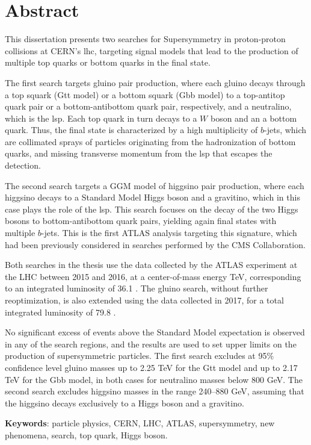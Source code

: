 \chapter*{Abstract}

This dissertation presents two searches for Supersymmetry in proton-proton collisions at CERN's \gls{lhc}, 
targeting signal models that lead to the production of multiple top quarks or bottom quarks in the final state.

The first search targets gluino pair production, where each gluino decays through a top squark (Gtt model) or a bottom squark (Gbb model) 
to a top-antitop quark pair or a bottom-antibottom quark pair, respectively, and a neutralino, which is the \gls{lsp}. 
Each top quark in turn decays to a $W$ boson and an a bottom quark.
Thus, the final state is characterized by a high multiplicity of $b$-jets, which are collimated sprays of particles originating from the hadronization of bottom quarks, and 
missing transverse momentum from the \gls{lsp} that escapes the detection. 

The second search targets a GGM model of higgsino pair production, 
where each higgsino decays to a Standard Model Higgs boson and 
a gravitino, which in this case plays the role of the \gls{lsp}. 
This search focuses on the decay of the two Higgs bosons to bottom-antibottom quark pairs, yielding again final states with multiple $b$-jets.
This is the first ATLAS analysis targeting this signature, which had been 
previously considered in searches performed by the CMS Collaboration.

Both searches in the thesis use the data collected by the ATLAS experiment at the LHC 
between 2015 and 2016, at a center-of-mass energy  \cmtre TeV,
corresponding to an integrated luminosity of 36.1 \ifb.
The gluino search, without further reoptimization, is also extended using the data collected in 2017, for a total integrated luminosity of 79.8 \ifb.

No significant excess of events above the Standard Model expectation is observed in any of the search regions, 
and the results are used to set upper limits on the production of supersymmetric particles. 
The first search excludes at 95\% confidence level gluino masses up to 2.25 TeV for the Gtt model 
and up to 2.17 TeV for the Gbb model, in both cases for neutralino masses below 800 GeV.
The second search excludes higgsino masses in the range 240--880 GeV, assuming 
that the higgsino decays exclusively to a Higgs boson and a gravitino. 

\par\bigskip
\par\bigskip 
\par\bigskip

\noindent \textbf{Keywords}: particle physics, CERN, LHC, ATLAS, supersymmetry, new phenomena, search, top quark, Higgs boson. 
